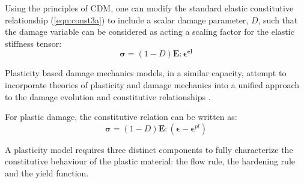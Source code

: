Using the principles of CDM, one can modify the standard elastic constitutive relationship (\ref{eqn:const3a}) to include a scalar damage parameter, $D$, such that the damage variable can be considered as acting a scaling factor for the elastic stiffness tensor: 
\begin{equation}
\boldsymbol{\sigma}=(1-D)\mathbf{E}:\boldsymbol{\epsilon^{el}}\label{eqn:const3}
\end{equation}




Plasticity based damage mechanics models, in a similar capacity, attempt to incorporate theories of plasticity and damage mechanics into a unified approach to the damage evolution and constitutive relationships \cite{zhang_continuum_2010}. 

For plastic damage, the constitutive relation can be written as:
\begin{equation}
\boldsymbol{\sigma}=(1-D)\mathbf{E}:(\boldsymbol{\epsilon}-\boldsymbol{\epsilon}^{pl})\label{eqn:const5}
\end{equation}

A plasticity model requires three distinct components to fully characterize the constitutive behaviour of the plastic material: the flow rule, the hardening rule and the yield function.




